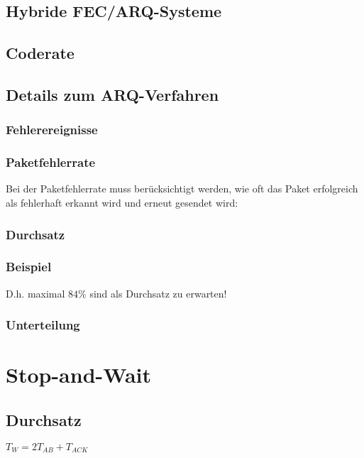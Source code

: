 \subsection{Hybride FEC/ARQ-Systeme}

\subsection{Coderate}

\subsection{Details zum ARQ-Verfahren}
\subsubsection{Fehlerereignisse}
\subsubsection{Paketfehlerrate}
Bei der Paketfehlerrate muss berücksichtigt werden, wie oft das Paket erfolgreich als fehlerhaft erkannt wird und erneut gesendet wird:
\subsubsection{Durchsatz}
\subsubsection{Beispiel}
D.h. maximal $84\%$ sind als Durchsatz zu erwarten!
\subsubsection{Unterteilung}

\section{Stop-and-Wait}
\subsection{Durchsatz}
$T_W=2T_{AB}+T_{ACK}$
